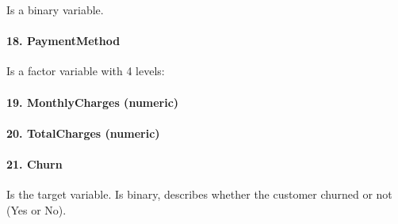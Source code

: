 \documentclass[
]{article}
\begin{document}
Is a binary variable.

\hypertarget{paymentmethod}{%
\paragraph{18. PaymentMethod}\label{paymentmethod}}

Is a factor variable with 4 levels:

\hypertarget{monthlycharges-numeric}{%
\paragraph{19. MonthlyCharges (numeric)}\label{monthlycharges-numeric}}

\hypertarget{totalcharges-numeric}{%
\paragraph{20. TotalCharges (numeric)}\label{totalcharges-numeric}}

\hypertarget{churn}{%
\paragraph{21. Churn}\label{churn}}

Is the target variable. Is binary, describes whether the customer
churned or not (Yes or No).
\end{document}
